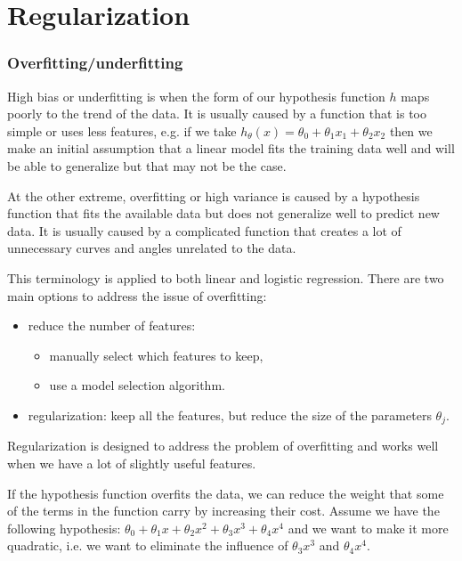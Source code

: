 \documentclass[a4paper,11pt]{report}
\begin{document}
\section{Regularization}

\subsubsection*{Overfitting/underfitting}

High bias or underfitting is when the form of our hypothesis function $h$ maps poorly to the trend of the data. It is usually caused by a function that is too simple or uses less features, e.g. if we take 
$h_\theta(x) = \theta_0 + \theta_1x_1 + \theta_2x_2$ then we make an initial assumption that a linear model fits the training data well and will be able to generalize but that may not be the case.

At the other extreme, overfitting or high variance is caused by a hypothesis function that fits the available data but does not generalize well to predict new data. It is usually caused by a complicated function that creates a lot of unnecessary curves and angles unrelated to the data.

This terminology is applied to both linear and logistic regression. There are two main options to address the issue of overfitting:
\begin{itemize}
\item reduce the number of features:
    \begin{itemize}
      \item manually select which features to keep,
      \item use a model selection algorithm.
    \end{itemize}

\item regularization: keep all the features, but reduce the size of the parameters $\theta_j$.
\end{itemize}
Regularization is designed to address the problem of overfitting and works well when we have a lot of slightly useful features.

If the hypothesis function overfits the data, we can reduce the weight that some of the terms in the function carry by increasing their cost. Assume we have the following hypothesis:
$\theta_0 + \theta_1x + \theta_2x^2 + \theta_3x^3 + \theta_4x^4$ and we want to make it more quadratic, i.e. we want to eliminate the influence of $\theta_3x^3$ and $\theta_4x^4$.
\end{document}
